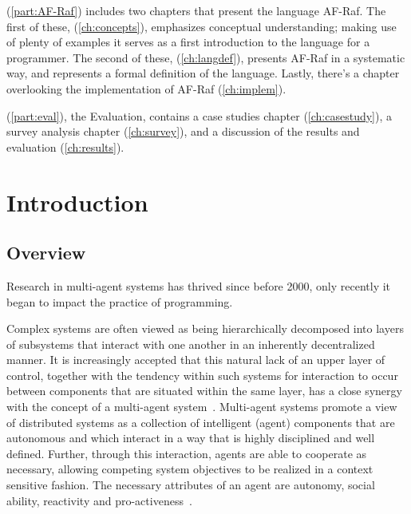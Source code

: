\documentclass[a4paper,12pt,oneside,fleqn]{book} %
\newcommand{\rg}[1]{\marginpar{\tiny\raggedright\textcolor{blue}{\bf rg:} #1}}
\renewcommand{\rg}{}
\begin{document}
(\autoref{part:AF-Raf}) includes two chapters that present the language
AF-Raf. The first of these, (\autoref{ch:concepts}), emphasizes conceptual
understanding; making use of
plenty of examples it serves as a first introduction to the language
for a programmer. The second of these, (\autoref{ch:langdef}), presents
AF-Raf in a systematic way, and represents a formal
definition of the language. Lastly, there's a chapter overlooking the
implementation of AF-Raf (\autoref{ch:implem}).

(\autoref{part:eval}), the Evaluation, contains a case studies chapter
(\autoref{ch:casestudy}), a survey analysis chapter
(\autoref{ch:survey}), and a discussion of the results and evaluation
(\autoref{ch:results}).

\mainmatter
\chapter{Introduction}\label{ch:intro} %

\section{Overview}

Research in multi-agent systems has thrived since before 2000, only
recently it began to impact the practice of programming.

Complex systems are often viewed as being hierarchically decomposed into
layers of subsystems that interact with one another in an inherently
decentralized manner. It is increasingly accepted that this natural lack of
an upper layer of control, together with the tendency within such systems
for interaction to occur between components that are situated within the
same layer, has a close synergy with the concept of a multi-agent
system~\cite{Jennings00agent-orientedsoftware}. Multi-agent systems promote
a view of distributed systems as a collection of intelligent (agent)
components that are autonomous and which interact in a way that is highly
disciplined and well defined. Further, through this interaction, agents are
able to cooperate as necessary, allowing competing system objectives to be
realized in a context sensitive fashion. The necessary attributes of an
agent are autonomy, social ability, reactivity and
pro-activeness~\cite{DBLP:journals/ker/WooldridgeJ95}.
\end{document}
